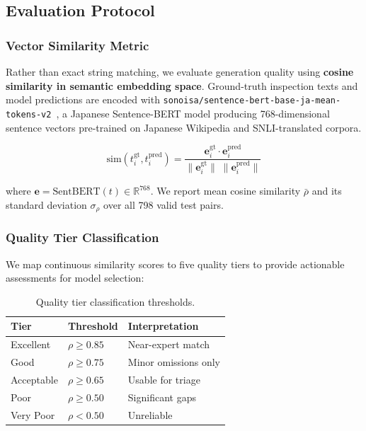 \documentclass[twocolumn]{article}
\begin{document}
\subsection{Evaluation Protocol}
\label{sec:evaluation}

\subsubsection{Vector Similarity Metric}

Rather than exact string matching, we evaluate generation quality using
\textbf{cosine similarity in semantic embedding space}.
Ground-truth inspection texts and model predictions are encoded with
\texttt{sonoisa/sentence-bert-base-ja-mean-tokens-v2}~\cite{sonoisa2021sbert},
a Japanese Sentence-BERT model producing 768-dimensional sentence vectors
pre-trained on Japanese Wikipedia and SNLI-translated corpora.

\begin{equation}
  \text{sim}(t_i^{\text{gt}}, t_i^{\text{pred}}) =
  \frac{\mathbf{e}_i^{\text{gt}} \cdot \mathbf{e}_i^{\text{pred}}}
       {\|\mathbf{e}_i^{\text{gt}}\| \;\|\mathbf{e}_i^{\text{pred}}\|}
  \label{eq:cosine}
\end{equation}

where $\mathbf{e} = \text{SentBERT}(t) \in \mathbb{R}^{768}$.
We report mean cosine similarity $\bar{\rho}$ and its standard deviation
$\sigma_\rho$ over all 798 valid test pairs.

\subsubsection{Quality Tier Classification}

We map continuous similarity scores to five quality tiers to provide
actionable assessments for model selection:

\begin{table}[h]
\centering
\caption{Quality tier classification thresholds.}
\label{tab:quality_tiers}
\begin{tabular}{lll}
\toprule
\textbf{Tier} & \textbf{Threshold} & \textbf{Interpretation} \\
\midrule
Excellent  & $\rho \geq 0.85$ & Near-expert match \\
Good       & $\rho \geq 0.75$ & Minor omissions only \\
Acceptable & $\rho \geq 0.65$ & Usable for triage \\
Poor       & $\rho \geq 0.50$ & Significant gaps \\
Very Poor  & $\rho <  0.50$   & Unreliable \\
\bottomrule
\end{tabular}
\end{table}
\end{document}
